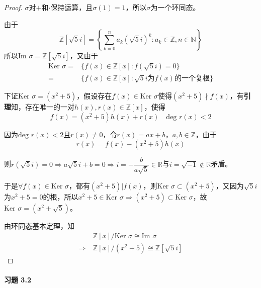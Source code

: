 \documentclass[12pt, a4paper, oneside]{ctexart}
\begin{document}
\begin{proof}
    $\sigma$对$+$和$\cdot$保持运算，且$\sigma(1)=1$，所以$\sigma$为一个环同态。

    由于
    \begin{equation*}
        \mathbb{Z}[\sqrt{5}i]=\left\{\sum_{k=0}^na_k(\sqrt{5}i)^k:a_k\in\mathbb{Z},n\in\mathbb{N}\right\}
    \end{equation*}
    所以$\text{Im }\sigma = \mathbb{Z}[\sqrt{5}i]$，又由于
    \begin{equation*}
        \begin{aligned}
            \text{Ker }\sigma = &\{f(x)\in\mathbb{Z}[x]:f(\sqrt{5}i)=0\}\\
            =&\{f(x)\in\mathbb{Z}[x]:\sqrt{5}i\text{为}f(x)\text{的一个复根}\}
        \end{aligned}
    \end{equation*}

    下证$\text{Ker }\sigma = (x^2+5)$，假设存在$f(x)\in\text{Ker }\sigma$使得$(x^2+5)\nmid f(x)$，有\textbf{引理}知，存在唯一的一对$h(x),r(x)\in\mathbb{Z}[x]$，使得
    \begin{equation*}
        f(x) = (x^2+5)h(x)+r(x)\quad \text{deg }r(x) < 2
    \end{equation*}

    因为$\text{deg }r(x) <2$且$r(x)\neq 0$，令$r(x) = ax + b$，$a,b\in \mathbb{Z}$，由于
    \begin{equation*}
        r(x)=f(x)-(x^2+5)h(x)
    \end{equation*}

    则$r(\sqrt{5}i)=0\Rightarrow a\sqrt{5}i+b=0\Rightarrow i=-\dfrac{b}{a\sqrt{5}}\in\mathbb{R}$与$i=\sqrt{-1}\notin\mathbb{R}$矛盾。

    于是$\forall f(x)\in \text{Ker }\sigma$，都有$(x^2+5)|f(x)$，则$\text{Ker }\sigma\subset (x^2+5)$，又因为$\sqrt{5}i$为$x^2+5=0$的根，所以$x^2+5\in\text{Ker }\sigma\Rightarrow(x^2+5)\subset \text{Ker }\sigma$，故$\text{Ker }\sigma = (x^2+\sqrt{5})$。

    由环同态基本定理，知
    \begin{equation*}
        \begin{aligned}
            &\ \mathbb{Z}[x]/\text{Ker }\sigma\cong \text{Im }\sigma\\
            \Rightarrow&\ \mathbb{Z}[x]/(x^2+5)\cong\mathbb{Z}[\sqrt{5}i]
        \end{aligned}
    \end{equation*}
\end{proof}
\paragraph{习题 3.2}
\end{document}
